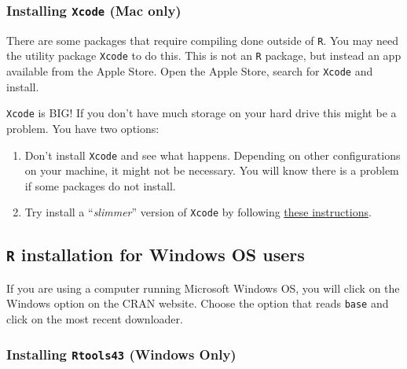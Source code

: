 \documentclass[
]{book}
\providecommand{\tightlist}{%
  \setlength{\itemsep}{0pt}\setlength{\parskip}{0pt}}
\newenvironment{rmdcaution}[1]
  {
  \begin{itemize}
  \renewcommand{\labelitemi}{
    \raisebox{-.7\height}[0pt][0pt]{
      {\setkeys{Gin}{width=3em,keepaspectratio}\texttt{[image: images/\#1]}}
    }
  }
  \setlength{\fboxsep}{1em}
  \begin{caution}
  \item
  }
  {
  \end{caution}
  \end{itemize}
  }
\begin{document}
\hypertarget{installing-xcode-mac-only}{%
\subsubsection{\texorpdfstring{Installing \texttt{Xcode} (Mac only)}{Installing Xcode (Mac only)}}\label{installing-xcode-mac-only}}

There are some packages that require compiling done outside of \texttt{R}. You may need the utility package \texttt{Xcode} to do this. This is not an \texttt{R} package, but instead an app available from the Apple Store. Open the Apple Store, search for \texttt{Xcode} and install.

\begin{rmdcaution}{caution}

\texttt{Xcode} is BIG! If you don't have much storage on your hard drive this might be a problem. You have two options:

\begin{enumerate}
\def\labelenumi{\arabic{enumi}.}
\tightlist
\item
  Don't install \texttt{Xcode} and see what happens. Depending on other configurations on your machine, it might not be necessary. You will know there is a problem if some packages do not install.
\item
  Try install a ``\emph{slimmer}'' version of \texttt{Xcode} by following \href{https://mac.install.guide/commandlinetools/index.html}{these instructions}.
\end{enumerate}

\end{rmdcaution}

\hypertarget{r-installation-for-windows-os-users}{%
\subsection{\texorpdfstring{\texttt{R} installation for Windows OS users}{R installation for Windows OS users}}\label{r-installation-for-windows-os-users}}

If you are using a computer running Microsoft Windows OS, you will click on the Windows option on the CRAN website. Choose the option that reads \texttt{base} and click on the most recent downloader.

\hypertarget{installing-rtools43-windows-only}{%
\subsubsection{\texorpdfstring{Installing \texttt{Rtools43} (Windows Only)}{Installing Rtools43 (Windows Only)}}\label{installing-rtools43-windows-only}}
\end{document}
